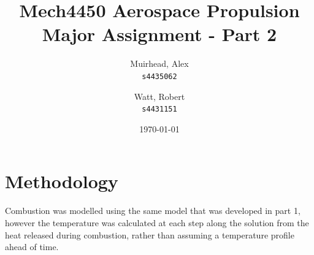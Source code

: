 \documentclass[a4paper]{article}
\title{
	\Large {\sc Mech}4450 Aerospace Propulsion \\
	\Huge Major Assignment - Part 2
}
\author{
	Muirhead, Alex \\ \texttt{s4435062}
	\and
	Watt, Robert \\ \texttt{s4431151}
}
\date{\today}
\begin{document}
\maketitle


\vspace{10em}

\newpage
{}

\section{Methodology}
Combustion was modelled using the same model that was developed in part 1, however the temperature was calculated at each step along the solution from the heat released during combustion, rather than assuming a temperature profile ahead of time.
\end{document}
